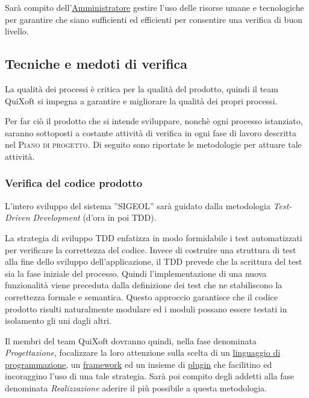 \documentclass[11pt,a4paper]{article}
\begin{document}
Sarà compito dell'\underline{Amministratore} gestire l'uso delle risorse umane e tecnologiche per garantire che siano sufficienti ed efficienti per consentire una verifica di buon livello.
\subsection{Tecniche e medoti di verifica}
La qualità dei processi è critica per la qualità del prodotto, quindi il team QuiXoft si impegna a garantire e migliorare la qualità dei propri processi.

Per far ciò il prodotto che si intende sviluppare, nonchè ogni processo istanziato, saranno sottoposti a costante attività di verifica in ogni fase di lavoro descritta nel \textsc{Piano di progetto}. Di seguito sono riportate le metodologie per attuare tale attività.
\subsubsection{Verifica del codice prodotto} \label{TDD}
L'intero sviluppo del sistema ''SIGEOL'' sarà guidato dalla metodologia \textit{Test-Driven Development} (d'ora in poi TDD).

La strategia di sviluppo TDD enfatizza in modo formidabile i test automatizzati per verificare la correttezza del codice. Invece di costruire una struttura di test alla fine dello sviluppo dell’applicazione, il TDD prevede che la scrittura del test sia la fase iniziale del processo. Quindi l’implementazione di una nuova funzionalità viene preceduta dalla definizione dei test che ne stabiliscono la correttezza formale e semantica. Questo approccio garantisce che il codice prodotto risulti naturalmente modulare ed i moduli possano essere testati in isolamento gli uni dagli altri.

Il membri del team QuiXoft dovranno quindi, nella fase denominata \textit{Proget\-tazione}, focalizzare la loro attenzione sulla scelta di un \underline{linguaggio di} \underline{programmazione}, un \underline{framework} ed un insieme di \underline{plugin} che facilitino ed incoraggino l'uso di una tale strategia. Sarà poi compito degli addetti alla fase denominata \textit{Realizzazione} aderire il più possibile a questa metodologia.
\end{document}
